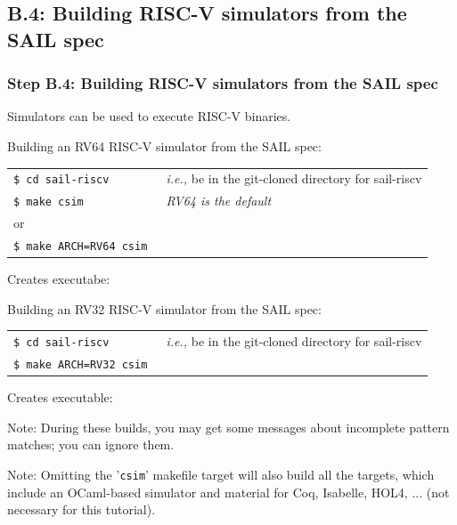 \documentclass[aspectratio=169]{beamer}
\newcommand{\hm}{\hspace*{1em}}
\newcommand{\hmmm}{\hspace*{3em}}
\begin{document}

\subsection{B.4: Building RISC-V simulators from the SAIL spec}


\begin{frame}
  \frametitle{Step B.4: Building RISC-V simulators from the SAIL spec}

  {\small Simulators can be used to execute RISC-V binaries.}

  \begin{block}{Building an RV64 RISC-V simulator from the SAIL spec:}
    \scriptsize
    \begin{tabular}{ll}
      \tt \$ cd sail-riscv \hmmm & \emph{i.e.,} be in the git-cloned directory for sail-riscv \\
      \tt \$ make  csim          & \emph{RV64 is the default} \\
      or \\
      \tt \$ make  ARCH=RV64  csim
    \end{tabular}

    \vspace*{1ex}

    Creates executabe: \hm {\tt c\_emulator/riscv\_sim\_RV64}
  \end{block}

  \begin{block}{Building an RV32 RISC-V simulator from the SAIL spec:}
    \scriptsize
    \begin{tabular}{ll}
      \tt \$ cd sail-riscv \hmmm & \emph{i.e.,} be in the git-cloned directory for sail-riscv \\
      \tt \$ make  ARCH=RV32  csim
    \end{tabular}

    \vspace*{1ex}

    Creates executable: \hm {\tt c\_emulator/riscv\_sim\_RV32}
  \end{block}

  {\tiny Note: During these builds, you may get some messages about
    incomplete pattern matches; you can ignore them.}

  {\tiny Note: Omitting the '{\tt csim}' makefile target will also
    build all the targets, which include an OCaml-based simulator and
    material for Coq, Isabelle, HOL4, ... (not necessary for this
    tutorial).}

\end{frame}
\end{document}
